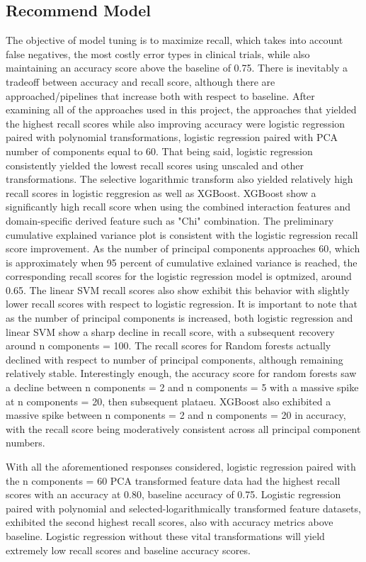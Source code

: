 \documentclass{article}
\begin{document}
\begin{itemize}
\section{Recommend Model}

The objective of model tuning is to maximize recall, which takes into account false negatives, the most costly error types in clinical trials, while also maintaining an accuracy score above the baseline of 0.75. There is inevitably a tradeoff between accuracy and recall score, although there are approached/pipelines that increase both with respect to baseline. After examining all of the approaches used in this project, the approaches that yielded the highest recall scores while also improving accuracy were logistic regression paired with polynomial transformations, logistic regression paired with PCA number of components equal to 60. That being said, logistic regression consistently yielded the lowest recall scores using unscaled and other transformations. The selective logarithmic transform also yielded relatively high recall scores in logistic reggresion as well as XGBoost. XGBoost show a significantly high recall score when using the combined interaction features and domain-specific derived feature such as "Chi" combination. The preliminary cumulative explained variance plot is consistent with the logistic regression recall score improvement. As the number of principal components approaches 60, which is approximately when 95 percent of cumulative exlained variance is reached, the corresponding recall scores for the logistic regression model is optmized, around 0.65. The linear SVM recall scores also show exhibit this behavior with slightly lower recall scores with respect to logistic regression. It is important to note that as the number of principal components is increased, both logistic regression and linear SVM show a sharp decline in recall score, with a subsequent recovery around n components = 100. The recall scores for Random forests actually declined with respect to number of principal components, although remaining relatively stable. Interestingly enough, the accuracy score for random forests saw a decline between n components = 2 and n components = 5 with a massive spike at n components = 20, then subsequent plataeu. XGBoost also exhibited a massive spike between n components = 2 and n components = 20 in accuracy, with the recall score being moderatively consistent across all principal component numbers. \newline

With all the aforementioned responses considered, logistic regression paired with the n components = 60 PCA transformed feature data had the highest recall scores with an accuracy at 0.80, baseline accuracy of 0.75. Logistic regression paired with polynomial and selected-logarithmically transformed feature datasets, exhibited the second highest recall scores, also with accuracy metrics above baseline. Logistic regression without these vital transformations will yield extremely low recall scores and baseline accuracy scores. \newline


\end{itemize}
\end{document}
